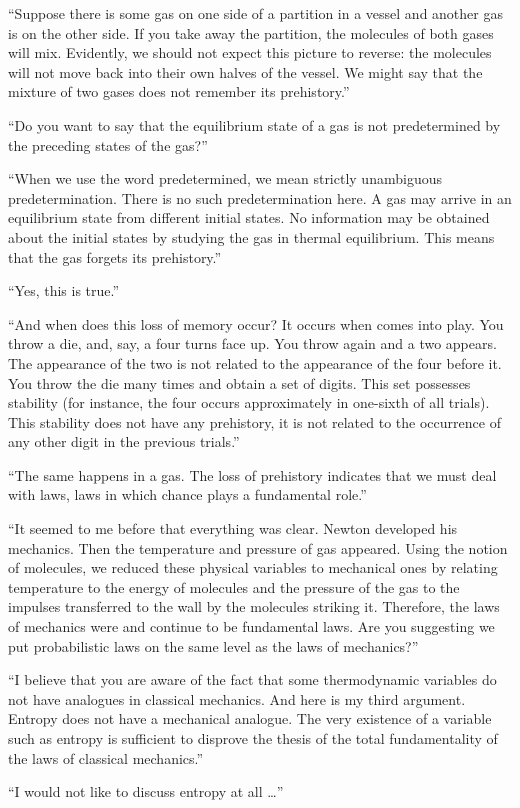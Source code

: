 \begin{dialogue}
``Suppose there is some gas on one side of a partition in a vessel and another gas is on the other side. If you take away the partition, the molecules of both gases will mix. Evidently, we should not expect this picture to reverse: the molecules will not move back into their own halves of the vessel. We might say that the mixture of two gases does not remember its prehistory.''

\prtnr ``Do you want to say that the equilibrium state of a gas is not predetermined by the preceding states of the gas?''

\athr ``When we use the word predetermined, we mean strictly unambiguous predetermination. There is no such predetermination here. A gas may arrive in an equilibrium state from different initial states. No information may be obtained about the initial states by studying the gas in thermal equilibrium. This means that the gas forgets its prehistory.''

\prtnr ``Yes, this is true.''

\athr ``And when does this loss of memory occur? It occurs when  comes into play. You throw a die, and, say, a four turns face up. You throw again and a two appears. The appearance of the two is not related to the appearance of the four before it. You throw the die many times and obtain a set of digits. This set possesses stability (for instance, the four occurs approximately in one-sixth of all trials). This stability does not have any prehistory, it is not related to the occurrence of any other digit in the previous trials.''

``The same happens in a gas. The loss of prehistory indicates that we must deal with  laws, laws in which chance plays a fundamental role.''

\prtnr ``It seemed to me before that everything was clear. Newton developed his mechanics. Then the temperature and pressure of gas appeared. Using the notion of molecules, we reduced these physical variables to mechanical ones by relating temperature to the energy of molecules and the pressure of the gas to the impulses transferred to the wall by the molecules striking it. Therefore, the laws of mechanics were and continue to be fundamental laws. Are you suggesting we put probabilistic laws on the same level as the laws of mechanics?''

\athr ``I believe that you are aware of the fact that some thermodynamic variables do not have analogues in classical mechanics. And here is my third argument. Entropy does not have a mechanical analogue. The very existence of a variable such as entropy is sufficient to disprove the thesis of the total fundamentality of the laws of classical mechanics.''

\prtnr	``I would not like to discuss entropy at all \ldots{}'' 


\end{dialogue}

